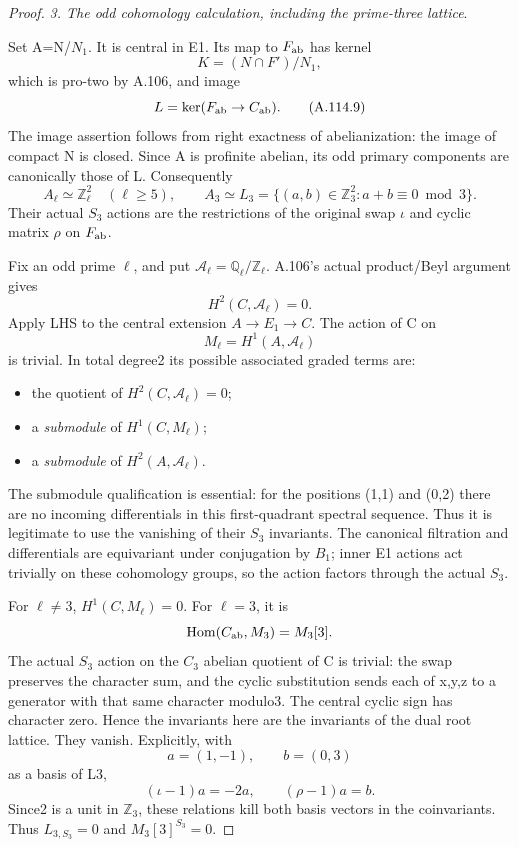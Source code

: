 \begin{proof}
\medskip\noindent\emph{3. The odd cohomology calculation, including the prime-three lattice}.

Set A=N/\(N_1\). It is central in E1. Its map to \(F_{\rm ab}\) has kernel
\[
K=(N\cap F')/N_1,
\]
which is pro-two by A.106, and image
\[
L=\ker(F_{\rm ab}\to C_{\rm ab}).                              \tag{A.114.9}
\]
The image assertion follows from right exactness of abelianization: the image of compact N is closed. Since A is profinite abelian, its odd primary components are canonically those of L. Consequently
\[
A_\ell\simeq\mathbb Z_\ell^2\quad(\ell\ge5),\qquad
A_3\simeq L_3=\{(a,b)\in\mathbb Z_3^2:a+b\equiv0\bmod3\}.     \tag{A.114.10}
\]
Their actual \(S_3\) actions are the restrictions of the original swap \(\iota\) and cyclic matrix \(\rho\) on \(F_{\rm ab}\).

Fix an odd prime \(\ell\), and put \(\mathcal A_\ell=\mathbb Q_\ell/\mathbb Z_\ell\). A.106's actual product/Beyl argument gives
\[
H^2(C,\mathcal A_\ell)=0.
\]
Apply LHS to the central extension \(A\to E_1\to C\). The action of C on
\[
M_\ell=H^1(A,\mathcal A_\ell)
\]
is trivial. In total degree2 its possible associated graded terms are:
\begin{itemize}
\item the quotient of \(H^2(C,\mathcal A_\ell)=0\);
\item a \emph{submodule} of \(H^1(C,M_\ell)\);
\item a \emph{submodule} of \(H^2(A,\mathcal A_\ell)\).

\end{itemize}
The submodule qualification is essential: for the positions (1,1) and (0,2) there are no incoming differentials in this first-quadrant spectral sequence. Thus it is legitimate to use the vanishing of their \(S_3\) invariants. The canonical filtration and differentials are equivariant under conjugation by \(B_1\); inner E1 actions act trivially on these cohomology groups, so the action factors through the actual \(S_3\).

For \(\ell\ne3\), \(H^1(C,M_\ell)=0\). For \(\ell=3\), it is
\[
\operatorname{Hom}(C_{\rm ab},M_3)=M_3[3].
\]
The actual \(S_3\) action on the \(C_3\) abelian quotient of C is trivial: the swap preserves the character sum, and the cyclic substitution sends each of x,y,z to a generator with that same character modulo3. The central cyclic sign has character zero. Hence the invariants here are the invariants of the dual root lattice. They vanish. Explicitly, with
\[
a=(1,-1),\qquad b=(0,3)
\]
as a basis of L3,
\[
(\iota-1)a=-2a,\qquad(\rho-1)a=b.
\]
Since2 is a unit in \(\mathbb Z_3\), these relations kill both basis vectors in the coinvariants. Thus \(L_{3,S_3}=0\) and \(M_3[3]^{S_3}=0\).


\end{proof}
